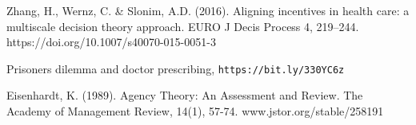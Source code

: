\documentclass[a4paper]{llncs}
\begin{document}
\begin{thebibliography}{8}
Zhang, H., Wernz, C. \& Slonim, A.D. (2016). Aligning incentives in health care: a multiscale decision theory approach. EURO J Decis Process 4, 219–244. https://doi.org/10.1007/s40070-015-0051-3

Prisoners dilemma and doctor prescribing, \texttt{https://bit.ly/330YC6z}

Eisenhardt, K. (1989). Agency Theory: An Assessment and Review. The Academy of Management Review, 14(1), 57-74. www.jstor.org/stable/258191

\end{thebibliography}

\end{document}
